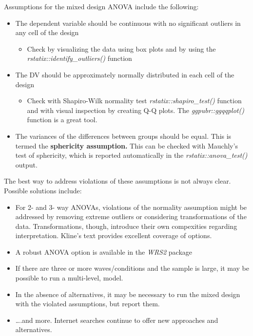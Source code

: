 \documentclass[
  11pt,
]{book}
\providecommand{\tightlist}{%
  \setlength{\itemsep}{0pt}\setlength{\parskip}{0pt}}
\begin{document}
Assumptions for the mixed design ANOVA include the following:

\begin{itemize}
\tightlist
\item
  The dependent variable should be continuous with no significant outliers in any cell of the design

  \begin{itemize}
  \tightlist
  \item
    Check by visualizing the data using box plots and by using the \emph{rstatix::identify\_outliers()} function
  \end{itemize}
\item
  The DV should be approximately normally distributed in each cell of the design

  \begin{itemize}
  \tightlist
  \item
    Check with Shapiro-Wilk normality test \emph{rstatix::shapiro\_test()} function and with visual inspection by creating Q-Q plots. The \emph{ggpubr::ggqqplot()} function is a great tool.
  \end{itemize}
\item
  The variances of the differences between groups should be equal. This is termed the \textbf{sphericity assumption.} This can be checked with Mauchly's test of sphericity, which is reported automatically in the \emph{rstatix::anova\_test()} output.
\end{itemize}

The best way to address violations of these assumptions is not always clear. Possible solutions include:

\begin{itemize}
\tightlist
\item
  For 2- and 3- way ANOVAs, violations of the normality assumption might be addressed by removing extreme outliers or considering transformations of the data. Transformations, though, introduce their own compexities regarding interpretation. Kline's text \citeyearpar{kline_principles_2016} provides excellent coverage of options.
\item
  A robust ANOVA option is available in the \emph{WRS2} package
\item
  If there are three or more waves/conditions and the sample is large, it may be possible to run a multi-level, model.
\item
  In the absence of alternatives, it may be necessary to run the mixed design with the violated assumptions, but report them.
\item
  \ldots.and more. Internet searches continue to offer new approaches and alternatives.
\end{itemize}
\end{document}
